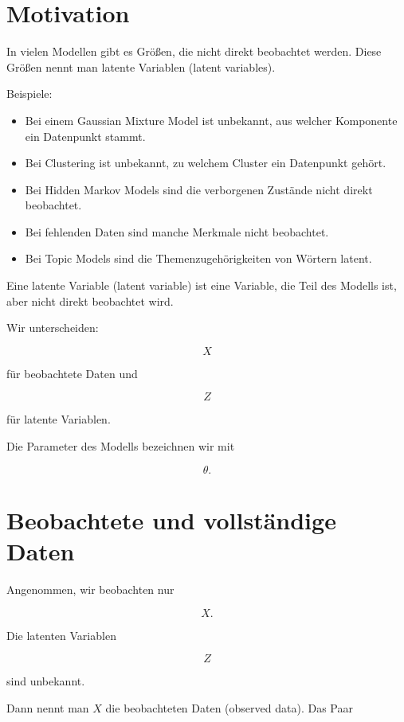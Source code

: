 \section{Motivation}

In vielen Modellen gibt es Größen, die nicht direkt beobachtet werden.
Diese Größen nennt man latente Variablen (latent variables).

Beispiele:

\begin{itemize}
    \item Bei einem Gaussian Mixture Model ist unbekannt, aus welcher Komponente ein Datenpunkt stammt.
    \item Bei Clustering ist unbekannt, zu welchem Cluster ein Datenpunkt gehört.
    \item Bei Hidden Markov Models sind die verborgenen Zustände nicht direkt beobachtet.
    \item Bei fehlenden Daten sind manche Merkmale nicht beobachtet.
    \item Bei Topic Models sind die Themenzugehörigkeiten von Wörtern latent.
\end{itemize}

\begin{definitionbox}
Eine latente Variable (latent variable) ist eine Variable, die Teil des Modells ist, aber nicht direkt beobachtet wird.
\end{definitionbox}

Wir unterscheiden:

\[
    X
\]

für beobachtete Daten und

\[
    Z
\]

für latente Variablen.

Die Parameter des Modells bezeichnen wir mit

\[
    \theta.
\]

\section{Beobachtete und vollständige Daten}

Angenommen, wir beobachten nur

\[
    X.
\]

Die latenten Variablen

\[
    Z
\]

sind unbekannt.

Dann nennt man \(X\) die beobachteten Daten (observed data).
Das Paar

